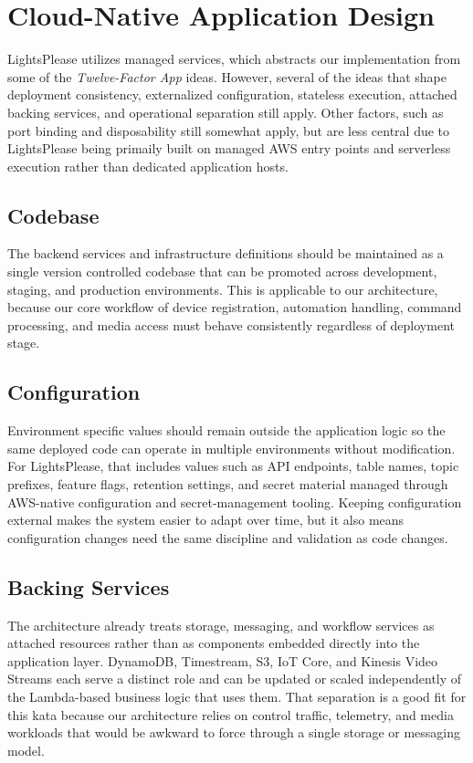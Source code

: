 \section{Cloud-Native Application Design}
LightsPlease utilizes managed services, which abstracts our implementation from some of the \textit{Twelve-Factor App} ideas. However, several of the ideas that shape deployment consistency, externalized configuration, stateless execution, attached backing services, and operational separation still apply. Other factors, such as port binding and disposability still somewhat apply, but are less central due to LightsPlease being primaily built on managed AWS entry points and serverless execution rather than dedicated application hosts.

\subsection{Codebase}

The backend services and infrastructure definitions should be maintained as a single version controlled codebase that can be promoted across development, staging, and production environments. This is applicable to our architecture, because our core workflow of device registration, automation handling, command processing, and media access must behave consistently regardless of deployment stage. 

\subsection{Configuration}

Environment specific values should remain outside the application logic so the same deployed code can operate in multiple environments without modification. For LightsPlease, that includes values such as API endpoints, table names, topic prefixes, feature flags, retention settings, and secret material managed through AWS-native configuration and secret-management tooling. Keeping configuration external makes the system easier to adapt over time, but it also means configuration changes need the same discipline and validation as code changes.

\subsection{Backing Services}

The architecture already treats storage, messaging, and workflow services as attached resources rather than as components embedded directly into the application layer. DynamoDB, Timestream, S3, IoT Core, and Kinesis Video Streams each serve a distinct role and can be updated or scaled independently of the Lambda-based business logic that uses them. That separation is a good fit for this kata because our architecture relies on control traffic, telemetry, and media workloads that would be awkward to force through a single storage or messaging model.

